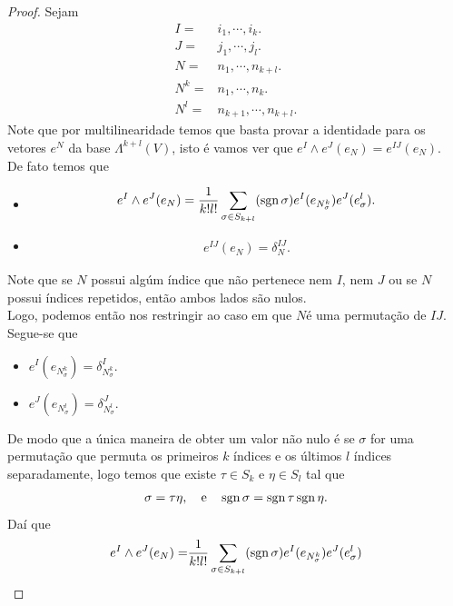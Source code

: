 \begin{proof} 
  Sejam
  \begin{align*}
    I=&i_1,\cdots,i_k.\\
    J=&j_1,\cdots,j_l.\\
    N=&n_1,\cdots,n_{k+l}.\\
    N^{k}=&n_1,\cdots,n_k.\\
    N^{l}=&n_{k+1},\cdots,n_{k+l}.
  \end{align*}
  Note que por multilinearidade temos que basta provar a identidade para os vetores $e^{N}$ da base $\Lambda^{{k+l}}(V)$, isto é vamos ver que $e^{I}\wedge e^{J}(e_N)=e^{IJ}(e_N)$.\\
  De fato temos que
  \begin{itemize}
    \item 
      \begin{align*}
        e^{I}\wedge e^{J}(e_N)=\frac{1}{k!l!}\sum_{\sigma\in S_{k+l}}(\operatorname{sgn}\sigma)e^{I}(e_{N^{k}_{\sigma}})e^{J}(e^{l}_{\sigma}).
      \end{align*}
    \item
      \begin{align*}
        e^{IJ}(e_{N})=\delta^{IJ}_{N}.
      \end{align*}
  \end{itemize}
  Note que se $N$ possui algúm índice que não pertenece nem $I$, nem $J$ ou se $N$ possui índices repetidos, então ambos lados são nulos.\\
  Logo, podemos então nos restringir ao caso em que $N$é uma permutação de $IJ$.\\
  Segue-se que
  \begin{itemize}
    \item $e^{I}(e_{N^{k}_{\sigma}})=\delta^{I}_{N^{k}_{\sigma}}$.
    \item $e^{J}(e_{N^{l}_{\sigma}})=\delta^{J}_{N^{l}_{\sigma}}$.
  \end{itemize}
  De modo que a única maneira de obter um valor não nulo é se $\sigma$ for uma permutação que permuta os primeiros $k$ índices e os últimos $l$ índices separadamente, logo temos que existe $\tau\in S_{k}$ e $\eta\in S_{l}$ tal que
  \begin{align*}
    \sigma=\tau\eta,\quad\text{e}\quad \operatorname{sgn}\sigma=\operatorname{sgn}\tau\operatorname{sgn}\eta.
  \end{align*}
  Daí que
  \begin{align*}
    e^{I}\wedge e^{J}(e_N)=&\frac{1}{k!l!}\sum_{\sigma\in S_{k+l}}(\sgn\sigma)e^{I}(e_{N^{k}_{\sigma}})e^{J}(e^{l}_{\sigma})\\

\end{align*}
\end{proof}
